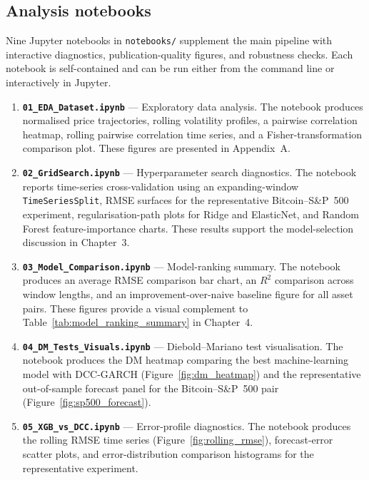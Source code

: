 \subsection{Analysis notebooks}

Nine Jupyter notebooks in \texttt{notebooks/} supplement the main pipeline with interactive diagnostics, publication-quality figures, and robustness checks. Each notebook is self-contained and can be run either from the command line or interactively in Jupyter.

\begin{enumerate}
    \item \textbf{\texttt{01\_EDA\_Dataset.ipynb}} --- Exploratory data analysis. The notebook produces normalised price trajectories, rolling volatility profiles, a pairwise correlation heatmap, rolling pairwise correlation time series, and a Fisher-transformation comparison plot. These figures are presented in Appendix~A.

    \item \textbf{\texttt{02\_GridSearch.ipynb}} --- Hyperparameter search diagnostics. The notebook reports time-series cross-validation using an expanding-window \texttt{TimeSeriesSplit}, RMSE surfaces for the representative Bitcoin--S\&P~500 experiment, regularisation-path plots for Ridge and ElasticNet, and Random Forest feature-importance charts. These results support the model-selection discussion in Chapter~3.

    \item \textbf{\texttt{03\_Model\_Comparison.ipynb}} --- Model-ranking summary. The notebook produces an average RMSE comparison bar chart, an $R^2$ comparison across window lengths, and an improvement-over-naive baseline figure for all asset pairs. These figures provide a visual complement to Table~\ref{tab:model_ranking_summary} in Chapter~4.

    \item \textbf{\texttt{04\_DM\_Tests\_Visuals.ipynb}} --- Diebold--Mariano test visualisation. The notebook produces the DM heatmap comparing the best machine-learning model with DCC-GARCH (Figure~\ref{fig:dm_heatmap}) and the representative out-of-sample forecast panel for the Bitcoin--S\&P~500 pair (Figure~\ref{fig:sp500_forecast}).

    \item \textbf{\texttt{05\_XGB\_vs\_DCC.ipynb}} --- Error-profile diagnostics. The notebook produces the rolling RMSE time series (Figure~\ref{fig:rolling_rmse}), forecast-error scatter plots, and error-distribution comparison histograms for the representative experiment.


\end{enumerate}
